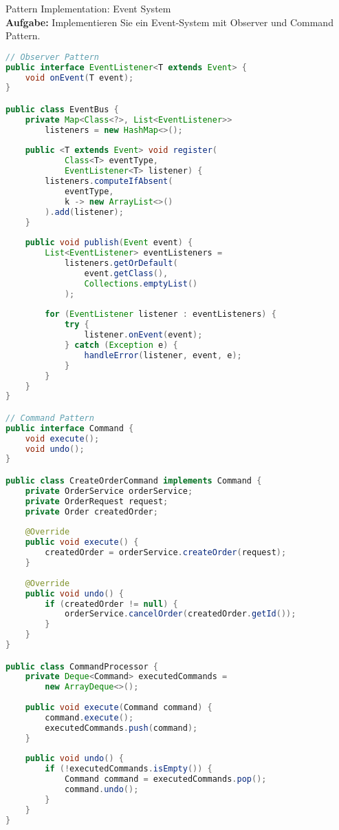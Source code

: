 \begin{example2}{Pattern Implementation: Event System}\\
\textbf{Aufgabe:} Implementieren Sie ein Event-System mit Observer und Command Pattern.

\begin{lstlisting}[language=Java, style=basesmol]
// Observer Pattern
public interface EventListener<T extends Event> {
    void onEvent(T event);
}

public class EventBus {
    private Map<Class<?>, List<EventListener>> 
        listeners = new HashMap<>();
    
    public <T extends Event> void register(
            Class<T> eventType, 
            EventListener<T> listener) {
        listeners.computeIfAbsent(
            eventType, 
            k -> new ArrayList<>()
        ).add(listener);
    }
    
    public void publish(Event event) {
        List<EventListener> eventListeners = 
            listeners.getOrDefault(
                event.getClass(), 
                Collections.emptyList()
            );
            
        for (EventListener listener : eventListeners) {
            try {
                listener.onEvent(event);
            } catch (Exception e) {
                handleError(listener, event, e);
            }
        }
    }
}

// Command Pattern
public interface Command {
    void execute();
    void undo();
}

public class CreateOrderCommand implements Command {
    private OrderService orderService;
    private OrderRequest request;
    private Order createdOrder;
    
    @Override
    public void execute() {
        createdOrder = orderService.createOrder(request);
    }
    
    @Override
    public void undo() {
        if (createdOrder != null) {
            orderService.cancelOrder(createdOrder.getId());
        }
    }
}

public class CommandProcessor {
    private Deque<Command> executedCommands = 
        new ArrayDeque<>();
    
    public void execute(Command command) {
        command.execute();
        executedCommands.push(command);
    }
    
    public void undo() {
        if (!executedCommands.isEmpty()) {
            Command command = executedCommands.pop();
            command.undo();
        }
    }
}
\end{lstlisting}


\end{example2}
